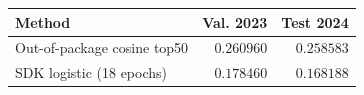 \begin{tabularx}{\linewidth}{@{}Xrr@{}}
\toprule
Method & Val. 2023 & Test 2024 \\
\midrule
Out-of-package cosine top50 & $0.260960$ & $0.258583$ \\
SDK logistic (18 epochs) & $0.178460$ & $0.168188$ \\
\bottomrule
\end{tabularx}
